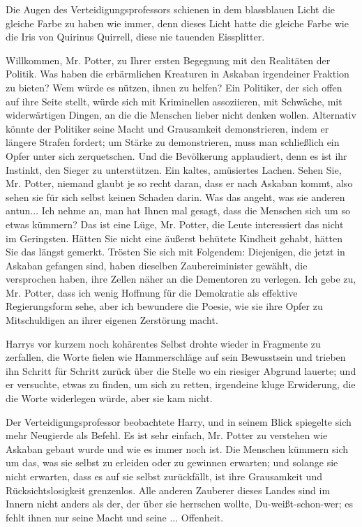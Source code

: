 Die Augen des Verteidigungsprofessors schienen in dem blassblauen Licht die
gleiche Farbe zu haben wie immer, denn dieses Licht hatte die gleiche Farbe wie
die Iris von Quirinus Quirrell, diese nie tauenden Eissplitter.

\glqq{}Willkommen, Mr. Potter, zu Ihrer ersten Begegnung mit den Realitäten der
Politik. Was haben die erbärmlichen Kreaturen in Askaban irgendeiner Fraktion zu
bieten? Wem würde es nützen, ihnen zu helfen? Ein Politiker, der sich offen auf
ihre Seite stellt, würde sich mit Kriminellen assoziieren, mit Schwäche, mit
widerwärtigen Dingen, an die die Menschen lieber nicht denken wollen. Alternativ
könnte der Politiker seine Macht und Grausamkeit demonstrieren, indem er längere
Strafen fordert; um Stärke zu demonstrieren, muss man schließlich ein Opfer
unter sich zerquetschen. Und die Bevölkerung applaudiert, denn es ist ihr
Instinkt, den Sieger zu unterstützen.\grqq{} Ein kaltes, amüsiertes Lachen.
\glqq{}Sehen Sie, Mr. Potter, niemand glaubt je so recht daran, dass er nach
Askaban kommt, also sehen sie für sich selbst keinen Schaden darin. Was das
angeht, was sie anderen antun... Ich nehme an, man hat Ihnen mal gesagt, dass
die Menschen sich um so etwas kümmern? Das ist eine Lüge, Mr. Potter, die Leute
interessiert das nicht im Geringsten. Hätten Sie nicht eine äußerst behütete
Kindheit gehabt, hätten Sie das längst gemerkt. Trösten Sie sich mit Folgendem:
Diejenigen, die jetzt in Askaban gefangen sind, haben dieselben Zaubereiminister
gewählt, die versprochen haben, ihre Zellen näher an die Dementoren zu verlegen.
Ich gebe zu, Mr. Potter, dass ich wenig Hoffnung für die Demokratie als
effektive Regierungsform sehe, aber ich bewundere die Poesie, wie sie ihre Opfer
zu Mitschuldigen an ihrer eigenen Zerstörung macht.\grqq{}

Harrys vor kurzem noch kohärentes Selbst drohte wieder in Fragmente zu
zerfallen, die Worte fielen wie Hammerschläge auf sein Bewusstsein und trieben
ihn Schritt für Schritt zurück über die Stelle wo ein riesiger Abgrund lauerte;
und er versuchte, etwas zu finden, um sich zu retten, irgendeine kluge
Erwiderung, die die Worte widerlegen würde, aber sie kam nicht.

Der Verteidigungsprofessor beobachtete Harry, und in seinem Blick spiegelte sich
mehr Neugierde als Befehl. \glqq{}Es ist sehr einfach, Mr. Potter zu verstehen
wie Askaban gebaut wurde und wie es immer noch ist. Die Menschen kümmern sich um
das, was sie selbst zu erleiden oder zu gewinnen erwarten; und solange sie nicht
erwarten, dass es auf sie selbst zurückfällt, ist ihre Grausamkeit und
Rücksichtslosigkeit grenzenlos. Alle anderen Zauberer dieses Landes sind im
Innern nicht anders als der, der über sie herrschen wollte, Du-weißt-schon-wer;
es fehlt ihnen nur seine Macht und seine ... Offenheit.\grqq{}

